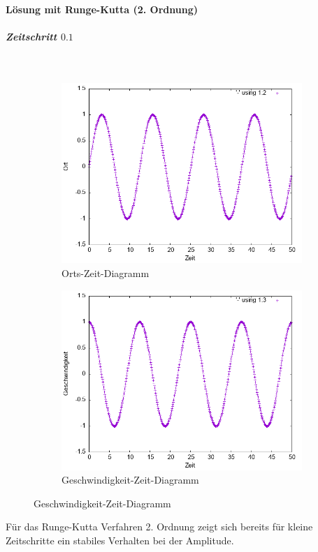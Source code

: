 \documentclass[
    oneside,
    ngerman,
    footinclude=false,
    captions=tableheading,
    DIV=12
]{scrartcl}
\begin{document}
        \paragraph*{Lösung mit Runge-Kutta (2. Ordnung)}
            \subparagraph*{Zeitschritt $0.1$}\,
            \begin{figure}[H]
                \centering
                \begin{subfigure}[b]{0.45\textwidth}
                    \centering
                    \includegraphics[width=\textwidth]{Bilddateien/RK2A1(a)-01-0-x.png}
                    \caption{Orts-Zeit-Diagramm}
                    \label{fig:RK2A1(a)-01-0-x}
                \end{subfigure}
                \hfill
                \begin{subfigure}[b]{0.45\textwidth}
                    \centering
                    \includegraphics[width=\textwidth]{Bilddateien/RK2A1(a)-01-0-v.png}
                    \caption{Geschwindigkeit-Zeit-Diagramm}
                    \label{fig:RK2A1(a)-01-0-v}
                \end{subfigure}
            \end{figure}
            Für das Runge-Kutta Verfahren 2. Ordnung zeigt sich bereits für kleine Zeitschritte ein stabiles Verhalten bei der Amplitude.
        
\end{document}
